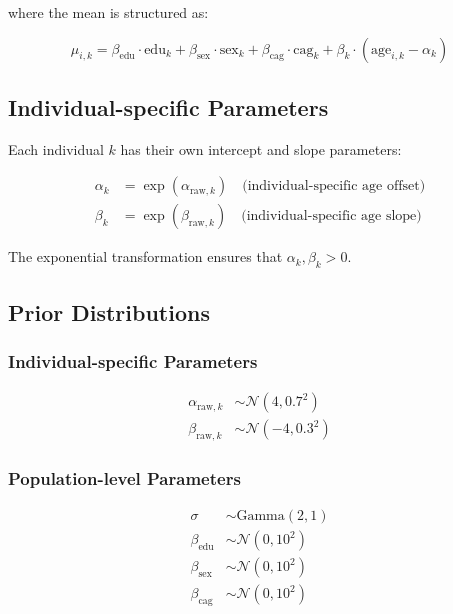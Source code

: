 \documentclass[12pt]{article}
\begin{document}
where the mean is structured as:

\begin{equation}
\mu_{i,k} = \beta_{\text{edu}} \cdot \text{edu}_k + \beta_{\text{sex}} \cdot \text{sex}_k + \beta_{\text{cag}} \cdot \text{cag}_k + \beta_k \cdot (\text{age}_{i,k} - \alpha_k)
\end{equation}

\subsection{Individual-specific Parameters}

Each individual $k$ has their own intercept and slope parameters:

\begin{align}
\alpha_k &= \exp(\alpha_{\text{raw},k}) \quad \text{(individual-specific age offset)} \\
\beta_k &= \exp(\beta_{\text{raw},k}) \quad \text{(individual-specific age slope)}
\end{align}

The exponential transformation ensures that $\alpha_k, \beta_k > 0$.

\subsection{Prior Distributions}

\subsubsection{Individual-specific Parameters}
\begin{align}
\alpha_{\text{raw},k} &\sim \mathcal{N}(4, 0.7^2) \\
\beta_{\text{raw},k} &\sim \mathcal{N}(-4, 0.3^2)
\end{align}

\subsubsection{Population-level Parameters}
\begin{align}
\sigma &\sim \text{Gamma}(2, 1) \\
\beta_{\text{edu}} &\sim \mathcal{N}(0, 10^2) \\
\beta_{\text{sex}} &\sim \mathcal{N}(0, 10^2) \\
\beta_{\text{cag}} &\sim \mathcal{N}(0, 10^2)
\end{align}
\end{document}

